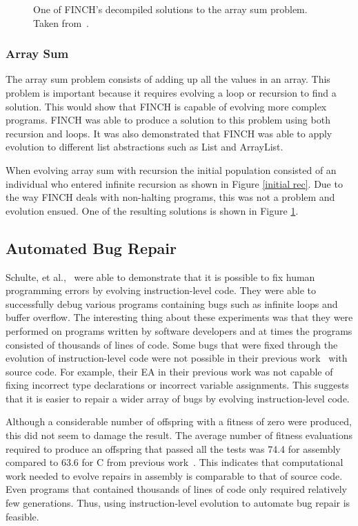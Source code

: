 \documentclass{sig-alternate}
\begin{document}
\begin{figure}
\centering
{}
\caption{One of FINCH's decompiled solutions to the array sum problem. Taken from~\cite{FINCH:2011}.}
\label{final rec}
\end{figure}

\subsubsection{Array Sum}
The array sum problem consists of adding up all the values in an array. This problem is important because it requires evolving a loop or recursion to find a solution. This would show that FINCH is capable of evolving more complex programs. FINCH was able to produce a solution to this problem using both recursion and loops. It was also demonstrated that FINCH was able to apply evolution to different list abstractions such as List and ArrayList.

When evolving array sum with recursion the initial population consisted of an individual who entered infinite recursion as shown in Figure \ref{initial rec}. Due to the way FINCH deals with non-halting programs, this was not a problem and evolution ensued. One of the resulting solutions is shown in Figure \ref{final rec}.


\subsection{Automated Bug Repair}

Schulte, et al.,~\cite{Assembly:2010} were able to demonstrate that it is possible to fix human programming errors by evolving instruction-level code. They were able to successfully debug various programs containing bugs such as infinite loops and buffer overflow. The interesting thing about these experiments was that they were performed on programs written by software developers and at times the programs consisted of thousands of lines of code. Some bugs that were fixed through the evolution of instruction-level code were not possible in their previous work~\cite{Forrest:2009} with source code. For example, their EA in their previous work was not capable of fixing incorrect type declarations or incorrect variable assignments. This suggests that it is easier to repair a wider array of bugs by evolving instruction-level code.

Although a considerable number of offspring with a fitness of zero were produced, this did not seem to damage the result. The average number of fitness evaluations required to produce an offspring that passed all the tests was 74.4 for assembly compared to 63.6 for C from previous work~\cite{Forrest:2009}. This indicates that computational work needed to evolve repairs in assembly is comparable to that of source code. Even programs that contained thousands of lines of code only required relatively few generations. Thus, using instruction-level evolution to automate bug repair is feasible.
 
\end{document}
